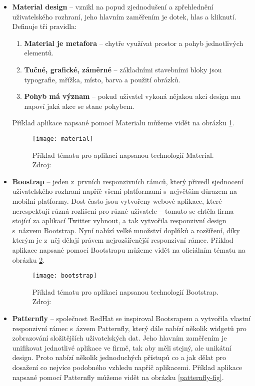 \begin{itemize}
\item \textbf{Material design} -- vznikl na popud zjednodušení a zpřehlednění uživatelského rozhraní, jeho hlavním zaměřením je dotek, hlas a kliknutí. Definuje tři pravidla:
\begin{enumerate}
  \item \textbf{Material je metafora} -- chytře využívat prostor a pohyb jednotlivých elementů.
  \item \textbf{Tučné, grafické, záměrné} -- základními stavebními bloky jsou typografie, mřížka, místo, barva a použití obrázků.
  \item \textbf{Pohyb má význam} -- pokud uživatel vykoná nějakou akci design mu napoví jaká akce se stane pohybem. \cite{material}
\end{enumerate}
Příklad aplikace napsané pomocí Materialu můžeme vidět na obrázku \ref{material-fig}.

\begin{figure}[h!]
\centering
\texttt{[image: material]}
\caption[Příklad tématu pro aplikaci napsanou technologií Material]{Příklad tématu pro aplikaci napsanou technologií Material. Zdroj: \cite{material}}
\label{material-fig}
\end{figure}

\item \textbf{Boostrap} -- jeden z~prvních responzivních rámců, který přivedl sjednocení uživatelského rozhraní napříč všemi platformami s~největším důrazem na mobilní platformy. Dost často jsou vytvořeny webové aplikace, které nerespektují různá rozlišení pro různé uživatele -- tomuto se chtěla firma stojící za aplikací Twitter vyhnout, a tak vytvořila responzivní design s~názvem Bootstrap. Nyní nabízí velké množství doplňků a rozšíření, díky kterým je z~něj dělají právem nejrozšířenější responzivní rámec. \cite{bootstrap} Příklad aplikace napsané pomocí Bootstrapu můžeme vidět na oficiálním tématu na obrázku \ref{bootstrap-fig}.

\begin{figure}[h!]
\centering
\texttt{[image: bootstrap]}
\caption[Příklad tématu pro aplikaci napsanou technologií Bootstrap]{Příklad tématu pro aplikaci napsanou technologií Bootstrap. Zdroj: \cite{bootstrap}}
\label{bootstrap-fig}
\end{figure}
\newpage
\item \textbf{Patternfly} -- společnost RedHat se inspiroval Bootsrapem a vytvořila vlastní responzivní rámec s~ázvem Patternfly, který dále nabízí několik widgetů pro zobrazování složitějších uživatelských dat. Jeho hlavním zaměřením je unifikovat jednotlivé aplikace ve firmě, tak aby měli stejný, ale unikátní design. Proto nabízí několik jednoduchých přístupů co a jak dělat pro dosažení co nejvíce podobného vzhledu napříč aplikacemi. \cite{patternfly} Příklad aplikace napsané pomocí Patternfly můžeme vidět na obrázku \ref{patternfly-fig}.


\end{itemize}
